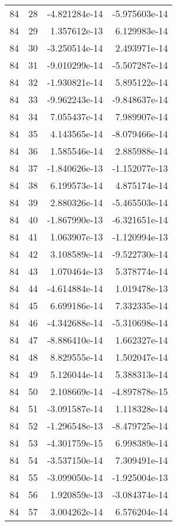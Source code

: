 \begin{tabular}{rrrr}
  84 &   28 & -4.821284e-14 & -5.975603e-14 \\
  84 &   29 &  1.357612e-13 &  6.129983e-14 \\
  84 &   30 & -3.250514e-14 &  2.493971e-14 \\
  84 &   31 & -9.010299e-14 & -5.507287e-14 \\
  84 &   32 & -1.930821e-14 &  5.895122e-14 \\
  84 &   33 & -9.962243e-14 & -9.848637e-14 \\
  84 &   34 &  7.055437e-14 &  7.989907e-14 \\
  84 &   35 &  4.143565e-14 & -8.079466e-14 \\
  84 &   36 &  1.585546e-14 &  2.885988e-14 \\
  84 &   37 & -1.840626e-13 & -1.152077e-13 \\
  84 &   38 &  6.199573e-14 &  4.875174e-14 \\
  84 &   39 &  2.880326e-14 & -5.465503e-14 \\
  84 &   40 & -1.867990e-13 & -6.321651e-14 \\
  84 &   41 &  1.063907e-13 & -1.120994e-13 \\
  84 &   42 &  3.108589e-14 & -9.522730e-14 \\
  84 &   43 &  1.070464e-13 &  5.378774e-14 \\
  84 &   44 & -4.614884e-14 &  1.019478e-13 \\
  84 &   45 &  6.699186e-14 &  7.332335e-14 \\
  84 &   46 & -4.342688e-14 & -5.310698e-14 \\
  84 &   47 & -8.886410e-14 &  1.662327e-14 \\
  84 &   48 &  8.829555e-14 &  1.502047e-14 \\
  84 &   49 &  5.126044e-14 &  5.388313e-14 \\
  84 &   50 &  2.108669e-14 & -4.897878e-15 \\
  84 &   51 & -3.091587e-14 &  1.118328e-14 \\
  84 &   52 & -1.296548e-13 & -8.479725e-14 \\
  84 &   53 & -4.301759e-15 &  6.998389e-14 \\
  84 &   54 & -3.537150e-14 &  7.309491e-14 \\
  84 &   55 & -3.099050e-14 & -1.925004e-13 \\
  84 &   56 &  1.920859e-13 & -3.084374e-14 \\
  84 &   57 &  3.004262e-14 &  6.576204e-14 \\

\end{tabular}

